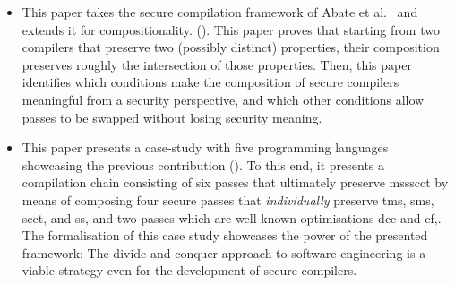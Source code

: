 \documentclass[dvipsnames,conference]{IEEEtran}
\theoremstyle{definition}
\begin{document}
\begin{itemize}
  \item %
        This paper takes the secure compilation framework of Abate et al.~\cite{abate2021extacc} and extends it for compositionality. ().
        This paper proves that starting from two compilers that preserve two (possibly distinct) properties, their composition preserves roughly the intersection of those properties.
        Then, this paper identifies which conditions make the composition of secure compilers meaningful from a security perspective, and which other conditions allow passes to be swapped without losing security meaning.

  \item %
        This paper presents a case-study with five programming languages showcasing the previous contribution ().
        To this end, it presents a compilation chain consisting of six passes that ultimately preserve \gls*{mssscct} by means of composing four secure passes that \emph{individually} preserve \gls*{tms}, \gls*{sms}, \gls*{scct}, and \gls*{ss}, and two passes which are well-known optimisations \gls*{dce} and \gls*{cf},.
        The formalisation of this case study showcases the power of the presented framework: The divide-and-conquer approach to software engineering is a viable strategy even for the development of secure compilers.


\end{itemize}
\end{document}
